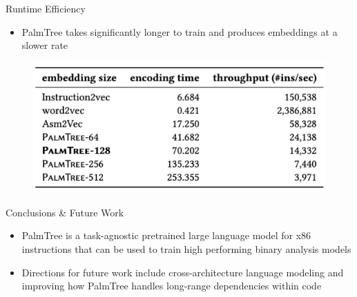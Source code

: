 \documentclass{beamer}
\begin{document}
\begin{frame}{Runtime Efficiency}
	
	\begin{itemize}
		\item PalmTree takes significantly longer to train and produces embeddings at a slower rate
	\end{itemize}
	
	\begin{figure}[h]
	\includegraphics[scale=.3]{images/runtime-efficiency.png}
	\end{figure}

\end{frame}

\begin{frame}{Conclusions \& Future Work}
	
	\begin{itemize}
		\item PalmTree is a task-agnostic pretrained large language model for x86 instructions that can be used to train high performing binary analysis models
		\item Directions for future work include cross-architecture language modeling and improving how PalmTree handles long-range dependencies within code %
	\end{itemize}
	
\end{frame}
\end{document}
